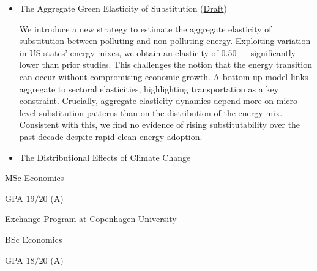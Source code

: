 \documentclass{practical-resume}
\begin{document}
	\begin{itemize}
	\item The Aggregate Green Elasticity of Substitution (\href{https://ruiagmsousa.github.io/research/agg-green-elasticity}{Draft})
		
	\begin{cvabstract}
We introduce a new strategy to estimate the aggregate elasticity of substitution between polluting and non-polluting energy. Exploiting variation in US states' energy mixes, we obtain an elasticity of 0.50 --- significantly lower than prior studies. This challenges the notion that the energy transition can occur without compromising economic growth. A bottom-up model links aggregate to sectoral elasticities, highlighting transportation as a key constraint. Crucially, aggregate elasticity dynamics depend more on micro-level substitution patterns than on the distribution of the energy mix. Consistent with this, we find no evidence of rising substitutability over the past decade despite rapid clean energy adoption.
	\end{cvabstract}

	\end{itemize}

	\begin{itemize}
		\item The Distributional Effects of Climate Change
	\end{itemize}
	

	\begin{position}{MSc Economics}{}
		\item GPA $19/20$ (A)
		\item Exchange Program at Copenhagen University
	\end{position}

	\begin{position}{BSc Economics}{}
		\item GPA $18/20$ (A)
	\end{position}

\end{document}
